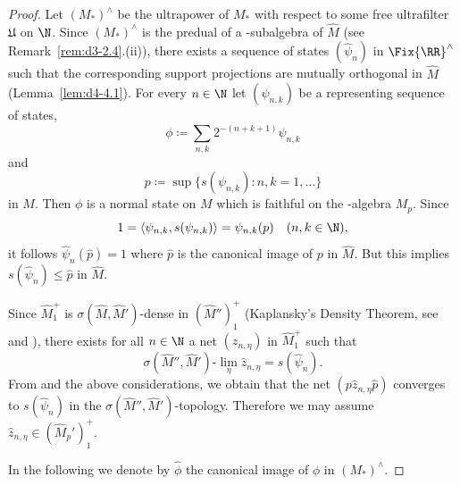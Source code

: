\begin{proof}
Let $ (M_{*})^{\wedge} $  be the ultrapower of\/ $ M_{*} $  with respect to some free ultrafilter $ \mathfrak{U} $  on $ \N $.
Since $ (M_{*})^{\wedge} $  is the predual of a \WA-subalgebra of\/ $ \widehat{M} $  
(see Remark~\ref{rem:d3-2.4}.(ii)), there exists a sequence of states $ (\widehat{\psi}_{n}) $  in $ \Fix{\RR}^{\wedge} $  such that the corresponding support projections are mutually orthogonal in $ \widehat{M} $  (Lemma~\ref{lem:d4-4.1}).
For every $ n \in \N $  let $ (\psi_{n,k}) $  be a representing sequence of states, 
\[
\phi \coloneqq \sum_{n,k} 2^{-(n+k+1)} \psi_{n,k}
\]
and 
\[
p \coloneqq \sup\{s(\psi_{n,k}): n,k=1,\ldots\}
\]
in $ M $.
Then $ \phi $  is a normal state on $ M $  which is faithful on the \WA-algebra $ M_{p} $.
Since 
\[
1 = \langle\psi_{n,k},s(\psi_{n,k})\rangle = \psi_{n,k}(p) \quad (n,k \in \N) ,
\]
it follows $ \widehat{\psi}_{n}(\widehat{p}) = 1 $  where $ \widehat{p} $  is the canonical image of\/ $ p $  in $ \widehat{M} $.
But this implies $ s(\widehat{\psi}_{n}) \leq \widehat{p} $  in $ \widehat{M} $.

Since $ \widehat{M}_{1}^{+} $  is $ \sigma(\widehat{M},\widehat{M}') $-dense in $ (\widehat{M}'')_{1}^{+} $  (Kaplansky's Density Theorem, see \textcite[1.9.1]{sakai:1971} and \textcite[1.8.9 and 1.8.12]{sakai:1971}), there exists for all $ n \in \N $  a net $ (z_{n,\eta}) $  in $ \widehat{M}_{1}^{+} $  such that
\[
\sigma(\widehat{M}'',\widehat{M}')\text{-}\lim_{\eta} \widehat{z}_{n,\eta} = s(\widehat{\psi}_{n}).
\]
From \textcite[1.7.8]{sakai:1971} and the above considerations, we obtain that the net $ (p\widehat{z}_{n,\eta}\widehat{p}) $  converges to $ s(\widehat{\psi}_{n}) $  in the $ \sigma(\widehat{M}'',\widehat{M}') $-topology.
Therefore we may assume $ \widehat{z}_{n,\eta} \in (\widehat{M}_{p}')_{1}^{+} $.

In the following we denote by $ \widehat{\phi} $  the canonical image of\/ $ \phi $  in $ (M_{*})^{\wedge} $.


\end{proof}
